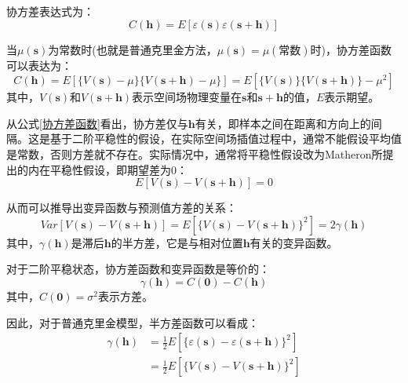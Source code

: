 协方差表达式为：
\begin{equation}
    C\left( \mathbf{h} \right) = E \left[ \varepsilon \left( \mathbf{s} \right) \varepsilon \left( \mathbf{s} + \mathbf{h} \right) \right]
    \label{协方差表达式}
\end{equation}

当$ \mu \left( \mathbf{s} \right) $为常数时(也就是普通克里金方法，$ \mu \left( \mathbf{s} \right) = \mu \left( \text{常数} \right) $时)，协方差函数可以表达为：
\begin{equation}
    C\left( \mathbf{h} \right) = E \left[ \{ V\left( \mathbf{s} \right) - \mu \} \{ V\left( \mathbf{s} + \mathbf{h} \right) - \mu \} \right] = E \left[ \{ V \left( \mathbf{s} \right) \} \{ V \left( \mathbf{s} + \mathbf{h} \right) \} - \mu^{2} \right]
    \label{协方差函数}
\end{equation}
其中，$  V \left( \mathbf{s} \right) $和$ V \left( \mathbf{s} + \mathbf{h} \right) $表示空间场物理变量在$ \mathbf{s} $和$ \mathbf{s} + \mathbf{h} $的值，$ E $表示期望。

从公式\ref{协方差函数}看出，协方差仅与$ \mathbf{h} $有关，即样本之间在距离和方向上的间隔。这是基于二阶平稳性的假设，在实际空间场插值过程中，通常不能假设平均值是常数，否则方差就不存在。实际情况中，通常将平稳性假设改为Matheron所提出的内在平稳性假设\textsuperscript{\cite{matheron1965variables}}，即期望差为0：
\begin{equation}
    E\left[ V\left( \mathbf{s} \right) - V \left( \mathbf{s} + \mathbf{h} \right) \right] = 0
\end{equation}

从而可以推导出变异函数与预测值方差的关系：
\begin{equation}
    Var \left[ V\left( \mathbf{s} \right) - V\left( \mathbf{s} + \mathbf{h} \right) \right] = E\left[ \{ V\left( \mathbf{s} \right) - V \left( \mathbf{s} + \mathbf{h} \right) \}^{2} \right] = 2 \gamma\left( \mathbf{h} \right)
\end{equation}
其中，$ \gamma\left( \mathbf{h} \right) $是滞后$ \mathbf{h} $的半方差，它是与相对位置$ \mathbf{h} $有关的变异函数。

对于二阶平稳状态，协方差函数和变异函数是等价的：
\begin{equation}
    \gamma \left( \mathbf{h} \right) = C \left( \mathbf{0} \right) - C \left( \mathbf{h} \right)
\end{equation}
其中，$ C \left( \mathbf{0} \right) = \sigma^{2} $表示方差。

因此，对于普通克里金模型，半方差函数可以看成：
\begin{equation}
    \begin{split}
        \gamma\left( \mathbf{h} \right)
        & = \frac{1}{2} E \left[ \{ \varepsilon\left( \mathbf{s} \right) - \varepsilon \left( \mathbf{s} + \mathbf{h} \right)\}^{2} \right] \\
        & = \frac{1}{2} E \left[ \{ V \left( \mathbf{s} \right) - V \left( \mathbf{s} + \mathbf{h} \right)\}^{2} \right]
    \end{split}
\end{equation}

